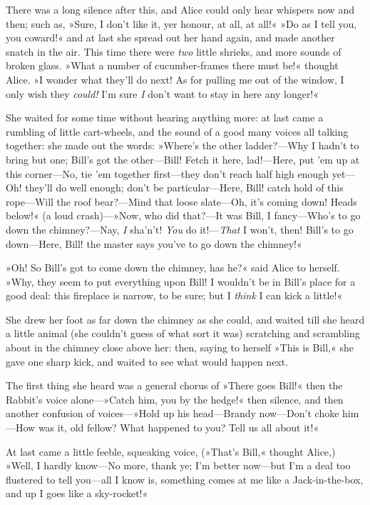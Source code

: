 There was a long silence after this, and Alice could only hear whispers now and then; such as, »Sure, I don't like it, yer honour, at all, at all!« »Do as I tell you, you coward!« and at last she spread out her hand again, and made another snatch in the air. This time there were \textit{two} little shrieks, and more sounds of broken glass. »What a number of cucumber-frames there must be!« thought Alice. »I wonder what they'll do next! As for pulling me out of the window, I only wish they \textit{could!} I'm sure \textit{I} don't want to stay in here any longer!«

She waited for some time without hearing anything more: at last came a rumbling of little cart-wheels, and the sound of a good many voices all talking together: she made out the words: »Where's the other ladder?—Why I hadn't to bring but one; Bill's got the other—Bill! Fetch it here, lad!—Here, put 'em up at this corner—No, tie 'em together first—they don't reach half high enough yet—Oh! they'll do well enough; don't be particular—Here, Bill! catch hold of this rope—Will the roof bear?—Mind that loose slate—Oh, it's coming down! Heads below!« (a loud crash)—»Now, who did that?—It was Bill, I fancy—Who's to go down the chimney?—Nay, \textit{I} sha'n't! \textit{You} do it!—\textit{That} I won't, then! Bill's to go down—Here, Bill! the master says you've to go down the chimney!«

»Oh! So Bill's got to come down the chimney, has he?« said Alice to herself. »Why, they seem to put everything upon Bill! I wouldn't be in Bill's place for a good deal: this fireplace is narrow, to be sure; but I \textit{think} I can kick a little!«

She drew her foot as far down the chimney as she could, and waited till she heard a little animal (she couldn't guess of what sort it was) scratching and scrambling about in the chimney close above her: then, saying to herself »This is Bill,« she gave one sharp kick, and waited to see what would happen next.

The first thing she heard was a general chorus of »There goes Bill!« then the Rabbit's voice alone—»Catch him, you by the hedge!« then silence, and then another confusion of voices—»Hold up his head—Brandy now—Don't choke him—How was it, old fellow? What happened to you? Tell us all about it!«

At last came a little feeble, squeaking voice, (»That's Bill,« thought Alice,) »Well, I hardly know—No more, thank ye; I'm better now—but I'm a deal too flustered to tell you—all I know is, something comes at me like a Jack-in-the-box, and up I goes like a sky-rocket!«

